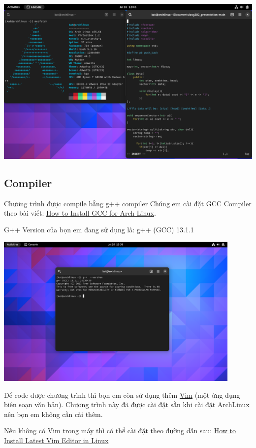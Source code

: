 \documentclass{report}
\begin{document}
        \includegraphics[width = 14cm]{images/archlinux.png}
        
        \subsection{Compiler}
        Chương trình được compile bằng g++ compiler
        Chúng em cài đặt GCC Compiler theo bài viết: \href{https://linuxhint.com/install-gcc-arch-linux/}{How to Install GCC for Arch Linux}.

        G++ Version của bọn em đang sử dụng là: g++ (GCC) 13.1.1

        \includegraphics[width = 12cm]{images/g++version.png}
        
        Để code được chương trình thì bọn em còn sử dụng thêm \href{https://www.vim.org/}{Vim} (một ứng dụng biên soạn văn bản). Chương trình này đã được cài đặt sẵn khi cài đặt ArchLinux nên bọn em không cần cài thêm.

        Nếu không có Vim trong máy thì có thể cài đặt theo đường dẫn sau: \href{https://tecadmin.net/install-vim-linux/}{How to Install Latest Vim Editor in Linux}
\end{document}
